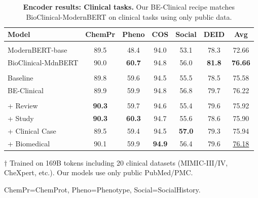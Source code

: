 \begin{table}[t]
\centering
\small
\setlength{\tabcolsep}{6pt}
\begin{threeparttable}[b]
\begin{tabular}{l S[table-format=2.1] S[table-format=2.1] S[table-format=2.1] S[table-format=2.1] S[table-format=2.1] S[table-format=2.1]}
\toprule
\textbf{Model} & {\textbf{ChemPr}} & {\textbf{Pheno}} & {\textbf{COS}} & {\textbf{Social}} & {\textbf{DEID}} & {\textbf{Avg}} \\
\midrule
{}
 \\[1pt]
ModernBERT-base & 89.5 & 48.4 & 94.0 & 53.1 & 78.3 & 72.66 \\
BioClinical-MdnBERT\tnote{$\dagger$} & 90.0 & \bfseries 60.7 & 94.8 & 56.0 & \bfseries 81.8 & \bfseries 76.66 \\
\midrule
{}
 \\[1pt]
Baseline & 89.8 & 59.6 & 94.5 & 55.5 & 78.5 & 75.58 \\
BE-Clinical & 89.9 & 59.9 & 94.8 & 56.8 & 79.7 & 76.22 \\
\midrule
{}
 \\[1pt]
\quad + Review & \bfseries 90.3 & 59.7 & 94.6 & 55.4 & 79.6 & 75.92 \\
\quad + Study & \bfseries 90.3 & \bfseries 60.3 & 94.7 & 55.6 & 78.6 & 75.90 \\
\quad + Clinical Case & 89.5 & 59.4 & 94.5 & \bfseries 57.0 & 79.3 & 75.94 \\
\quad + Biomedical & 90.1 & 59.9 & \bfseries 94.9 & 56.4 & 79.6 & \underline{76.18} \\
\bottomrule
\end{tabular}
\begin{tablenotes}
  \small
  \item[$\dagger$] Trained on 169B tokens including 20 clinical datasets (MIMIC-III/IV, CheXpert, etc.). Our models use only public PubMed/PMC.
  \item ChemPr=ChemProt, Pheno=Phenotype, Social=SocialHistory.
\end{tablenotes}
\end{threeparttable}
\caption{\textbf{Encoder results: Clinical tasks.} Our BE-Clinical recipe matches BioClinical-ModernBERT on clinical tasks using only public data.}
\label{tab:encoder-clinical}
\end{table}

